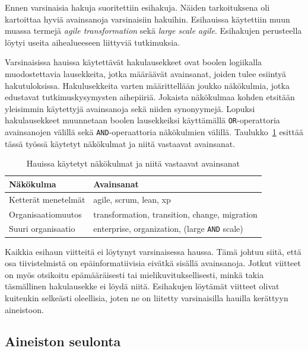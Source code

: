 Ennen varsinaisia hakuja suoritettiin esihakuja. Näiden tarkoituksena oli
kartoittaa hyviä avainsanoja varsinaisiin hakuihin. Esihauissa käytettiin muun
muassa termejä \textit{agile transformation} sekä \textit{large scale agile}.
Esihakujen perusteella löytyi useita aihealueeseen liittyviä tutkimuksia.

Varsinaisissa hauissa käytettävät hakulausekkeet ovat boolen logiikalla
muodostettavia lausekkeita, jotka määräävät avainsanat, joiden tulee esiintyä
hakutuloksissa. Hakulusekkeita varten määrittellään joukko näkökulmia, jotka
edustavat tutkimuskysymysten aihepiiriä. Jokaista näkökulmaa kohden etsitään
yleisimmin käytettyjä avainsanoja sekä niiden synonyymejä. Lopuksi
hakulausekkeet muunnetaan boolen lausekkeiksi käyttämällä
\texttt{OR}-operattoria avainsanojen välillä sekä \texttt{AND}-operaattoria
näkökulmien välillä. Taulukko~\ref{table:hakulausekkeet} esittää tässä työssä
käytetyt näkökulmat ja niitä vastaavat avainsanat.

\begin{table}[h]
    \begin{tabular}{|l|l|}
        \hline
        Näkökulma           & Avainsanat   \\ \hline
        Ketterät menetelmät & agile, scrum, lean, xp \\ 
        Organisaatiomuutos  & transformation, transition, change, migration \\
        Suuri organisaatio  & enterprise, organization, (large \texttt{AND} scale) \\
        \hline
    \end{tabular}
	\caption{Hauissa käytetyt näkökulmat ja niitä vastaavat avainsanat}
	\label{table:hakulausekkeet}
\end{table}

Kaikkia esihaun viitteitä ei löytynyt varsinaisessa haussa. Tämä johtuu siitä,
että osa tiivistelmistä on epäinformatiivisia eivätkä sisällä avainsanoja.
Jotkut viitteet on myös otsikoitu epämääräisesti tai mielikuvituksellisesti,
minkä takia täsmällinen hakulausekke ei löydä niitä. Esihakujen löytämät
viitteet olivat kuitenkin selkeästi oleellisia, joten ne on liitetty
varsinaisilla hauilla kerättyyn aineistoon.

\subsection{Aineiston seulonta}


